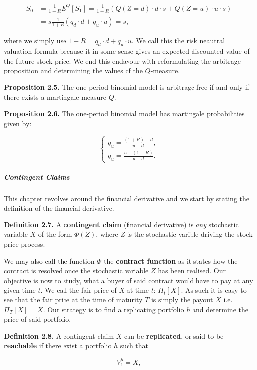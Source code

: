 \documentclass[
]{article}
\begin{document}
\begin{align*}
S_0&=\frac{1}{1+R}E^Q[S_1]=\frac{1}{1+R}(Q(Z=d)\cdot d\cdot s+Q(Z=u)\cdot u\cdot s)\\
&=s\frac{1}{1+R}(q_d\cdot d+q_u\cdot u)=s,
\end{align*}

where we simply use \(1+R=q_d\cdot d+q_u\cdot u\). We call this the risk
neautral valuation formula because it in some sense gives an expected
discounted value of the future stock price. We end this endavour with
reformulating the arbitrage proposition and determining the values of
the \(Q\)-measure.

\textbf{Proposition 2.5.} The one-period binomial model is arbitrage
free if and only if there exists a martingale measure \(Q\).

\textbf{Proposition 2.6.} The one-period binomial model has martingale
probabilities given by:

\[\left\{\begin{matrix}q_u=\frac{(1+R)-d}{u-d},\\ q_u=\frac{u-(1+R)}{u-d}.\end{matrix}\right.\]

\hypertarget{contingent-claims}{%
\subparagraph{Contingent Claims}\label{contingent-claims}}

This chapter revolves around the financial derivative and we start by
stating the definition of the financial derivative.

\textbf{Definition 2.7.} A \textbf{contingent claim} (financial
derivative) is \emph{any} stochastic variable \(X\) of the form
\(\Phi(Z)\), where \(Z\) is the stochastic varible driving the stock
price process.

We may also call the function \(\Phi\) the \textbf{contract function} as
it states how the contract is resolved once the stochastic variable
\(Z\) has been realised. Our objective is now to study, what a buyer of
said contract would have to pay at any given time \(t\). We call the
fair price of \(X\) at time \(t\): \(\Pi_t[X]\). As such it is easy to
see that the fair price at the time of maturity \(T\) is simply the
payout \(X\) i.e.~\(\Pi_T[X]=X\). Our strategy is to find a replicating
portfolio \(h\) and determine the price of said portfolio.

\textbf{Definition 2.8.} A contingent claim \(X\) can be
\textbf{replicated}, or said to be \textbf{reachable} if there exist a
portfolio \(h\) such that

\[
V_1^h=X,
\]
\end{document}
